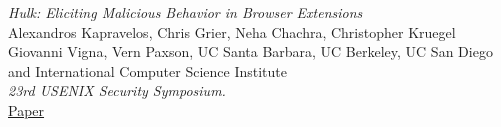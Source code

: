 \documentclass[12pt]{article}
\begin{document}
\begin{multicols}{2}
\begin{thebibliography}{9}
\emph{Hulk: Eliciting Malicious Behavior in Browser Extensions}\\
Alexandros Kapravelos, Chris Grier, Neha Chachra, Christopher Kruegel
Giovanni Vigna, Vern Paxson,
UC Santa Barbara,
UC Berkeley, 
UC San Diego and 
International Computer Science Institute\\
\emph{23rd USENIX Security Symposium.}\\
\href{https://www.usenix.org/system/files/conference/usenixsecurity14/sec14-paper-kapravelos.pdf}{Paper}\\	
\end{thebibliography}
\end{multicols}
 
\end{document}
